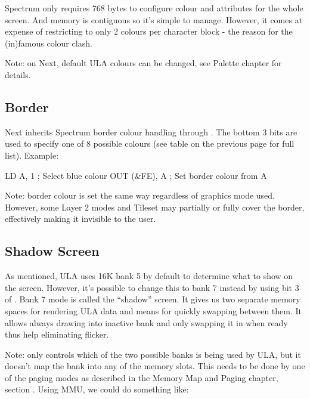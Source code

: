 Spectrum only requires 768 bytes to configure colour and attributes for the whole screen. And memory is contiguous so it's simple to manage. However, it comes at expense of restricting to only 2 colours per character block - the reason for the (in)famous colour clash.

Note: on Next, default ULA colours can be changed, see Palette chapter  for details.


\subsection{Border}

Next inherits Spectrum border colour handling through . The bottom 3 bits are used to specify one of 8 possible colours (see table on the previous page for full list). Example:

\begin{tcblisting}{}
	LD A, 1			; Select blue colour
	OUT (&FE), A	; Set border colour from A
\end{tcblisting}

Note: border colour is set the same way regardless of graphics mode used. However, some Layer 2 modes and Tileset may partially or fully cover the border, effectively making it invisible to the user.


\subsection{Shadow Screen}

As mentioned, ULA uses 16K bank 5 by default to determine what to show on the screen. However, it's possible to change this to bank 7 instead by using bit 3 of . Bank 7 mode is called the ``shadow'' screen. It gives us two separate memory spaces for rendering ULA data and means for quickly swapping between them. It allows always drawing into inactive bank and only swapping it in when ready thus help eliminating flicker.

Note:  only controls which of the two possible banks is being used by ULA, but it doesn't map the bank into any of the memory slots. This needs to be done by one of the paging modes as described in the Memory Map and Paging chapter, section . Using MMU, we could do something like:

